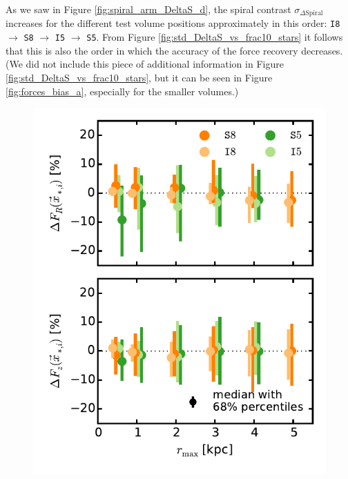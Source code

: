 \documentclass[iop,revtex4,numberedappendix,appendixfloats]{emulateapj}
\begin{document}
As we saw in Figure \ref{fig:spiral_arm_DeltaS_d}, the spiral contrast $\sigma_{\Delta \text{Spiral}}$ increases for the different test volume positions approximately in this order: \texttt{I8} $\longrightarrow$ \texttt{S8} $\longrightarrow$ \texttt{I5} $\longrightarrow$ \texttt{S5}. From Figure \ref{fig:std_DeltaS_vs_frac10_stars} it follows that this is also the order in which the accuracy of the force recovery decreases. (We did not include this piece of additional information in Figure \ref{fig:std_DeltaS_vs_frac10_stars}, but it can be seen in Figure \ref{fig:forces_bias_a}, especially for the smaller volumes.)

\begin{figure}[!htbp]
\centering
  \includegraphics[width=\columnwidth]{fig/MNdHHdiffSph2_bias_in_forces_recovery_3_a.pdf}

\end{figure}
\end{document}
